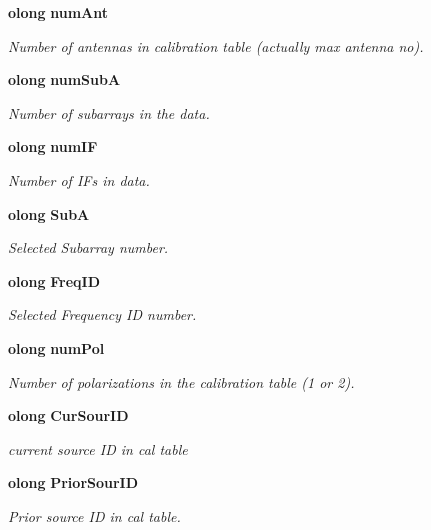 \begin{CompactItemize}
{\bf olong} {\bf num\-Ant}
\begin{CompactList}\small\item\em Number of antennas in calibration table (actually max antenna no). \item\end{CompactList}\item 
{\bf olong} {\bf num\-Sub\-A}
\begin{CompactList}\small\item\em Number of subarrays in the data. \item\end{CompactList}\item 
{\bf olong} {\bf num\-IF}
\begin{CompactList}\small\item\em Number of IFs in data. \item\end{CompactList}\item 
{\bf olong} {\bf Sub\-A}
\begin{CompactList}\small\item\em Selected Subarray number. \item\end{CompactList}\item 
{\bf olong} {\bf Freq\-ID}
\begin{CompactList}\small\item\em Selected Frequency ID number. \item\end{CompactList}\item 
{\bf olong} {\bf num\-Pol}
\begin{CompactList}\small\item\em Number of polarizations in the calibration table (1 or 2). \item\end{CompactList}\item 
{\bf olong} {\bf Cur\-Sour\-ID}
\begin{CompactList}\small\item\em current source ID in cal table \item\end{CompactList}\item 
{\bf olong} {\bf Prior\-Sour\-ID}
\begin{CompactList}\small\item\em Prior source ID in cal table. \item\end{CompactList}\item 

\end{CompactItemize}
